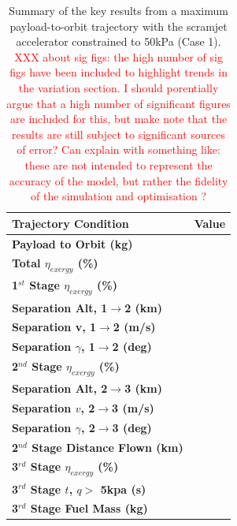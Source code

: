 \begin{table}[ht]%
	\centering
	
	\begin{tabular}{l c } 
		\hline \textbf{Trajectory Condition}
		&Value
		\\
		\hline \textbf{Payload to Orbit (kg)}
		& \textbf{\PayloadToOrbitConstqNoReturn}
		\\
		\textbf{Total $\eta_{exergy}$ (\%)}
		& \textbf{\totalExergyEffConstqNoReturn}
		\\
		\hline 
		\textbf{1$^{st}$ Stage $\eta_{exergy}$ (\%)}
		& \textbf{\firstExergyEffConstqNoReturn}
		\\
	
		\textbf{Separation Alt, 1$\rightarrow$2 (km)}
		& \firstsecondSeparationAltConstqNoReturn
		\\
		\textbf{Separation v, 1$\rightarrow$2 (m/s)}
		& \firstsecondSeparationvConstqNoReturn
		\\
		\textbf{Separation $\gamma$, 1$\rightarrow$2 (deg)}
		& \firstsecondSeparationgammaConstqNoReturn
		\\
		\hline 
		\textbf{2$^{nd}$ Stage $\eta_{exergy}$ (\%)}
		& \textbf{\secondExergyEffConstqNoReturn}
		\\
		\textbf{Separation Alt, 2$\rightarrow$3 (km)}
		& \secondthirdSeparationAltConstqNoReturn
		\\
		\textbf{Separation $v$, 2$\rightarrow$3 (m/s)}
		& \secondthirdSeparationvConstqNoReturn
		\\
		\textbf{Separation $\gamma$, 2$\rightarrow$3 (deg)}
		& \secondthirdSeparationgammaConstqNoReturn
		\\
		\textbf{2$^{nd}$ Stage Distance Flown (km)}
		& \SecondDistConstqNoReturn
		\\
		\hline 
		\textbf{3$^{rd}$ Stage $\eta_{exergy}$ (\%)}
		& \textbf{\thirddExergyEffConstqNoReturn}
		\\
	
		\textbf{3$^{rd}$ Stage $t$, $q >$ 5kpa (s)}
		& \thirdqOverFiveConstqNoReturn
		\\
		\textbf{3$^{rd}$ Stage Fuel Mass (kg)}
		& \thirdmFuelConstqNoReturn
		\\
		\hline 
	\end{tabular} 
	
	\caption{Summary of the key results from a maximum payload-to-orbit trajectory with the scramjet accelerator constrained to 50kPa (Case 1). \textcolor{red}{XXX about sig figs: the high number of sig figs have been included to highlight trends in the variation section. I should porentially argue that a high number of significant figures are included for this, but make note that the results are still subject to significant sources of error? Can explain with something like: these are not intended to represent the accuracy of the model, but rather the fidelity of the simulation and optimisation ?}}
	\label{tab:constqsummary} %
\end{table}
